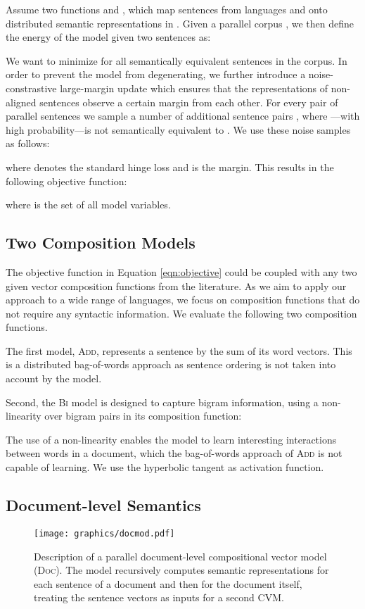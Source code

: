 \documentclass[11pt]{article}
\newcommand{\addMod}{\textsc{Add}\xspace}
\newcommand{\flatMod}{\textsc{Bi}\xspace}
\newcommand{\docMod}{\textsc{Doc}\xspace}
\newcommand{\CVM}{\textsc{CVM}\xspace}
\begin{document}
Assume two functions 
and , which map sentences from languages  and
 onto distributed semantic representations in . Given a
parallel corpus , we then define the energy of the model given two sentences
 as:

We want to minimize  for all semantically equivalent sentences in the
corpus. In order to prevent the model from degenerating, we further introduce a
noise-constrastive large-margin update which ensures that the representations of
non-aligned sentences observe a certain margin from each other.
For every pair of parallel sentences  we sample a number of additional
sentence pairs , where ---with high probability---is not
semantically equivalent to . We use these noise samples as follows:

where  denotes the standard hinge loss and  is the margin.
This results in the following objective function:

where  is the set of all model variables.

\subsection{Two Composition Models}

The objective function in Equation \ref{eqn:objective} could be
coupled with any two given vector composition functions  from the
literature. As we aim to apply our approach to a wide range of languages, we
focus on composition functions that do not require any syntactic information. We
evaluate the following two composition functions.

The first model, \addMod, represents a sentence by the sum of its word vectors.
This is a distributed bag-of-words approach as sentence ordering is not taken
into account by the model.

Second, the \flatMod model is designed to capture bigram information, using a
non-linearity over bigram pairs in its composition function:

The use of a non-linearity enables the model to learn interesting interactions
between words in a document, which the bag-of-words approach of \addMod is not
capable of learning. We use the hyperbolic tangent as activation function.

\subsection{Document-level Semantics}\label{sec:docmod}

\begin{figure}[t]\centering
  \captionsetup{font=small}
  \texttt{[image: graphics/docmod.pdf]}
  \caption{Description of a parallel document-level compositional vector model
    (\docMod). The model recursively computes semantic representations for each
    sentence of a document and then for the document itself, treating the sentence
    vectors as inputs for a second \CVM.
    }\label{fig:docmod}
\end{figure}
\end{document}
